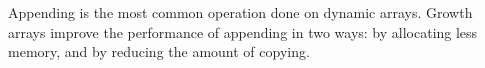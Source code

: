 Appending is the most common operation done on dynamic arrays. Growth arrays improve the performance of appending in two ways: by allocating less memory, and by reducing the amount of copying.